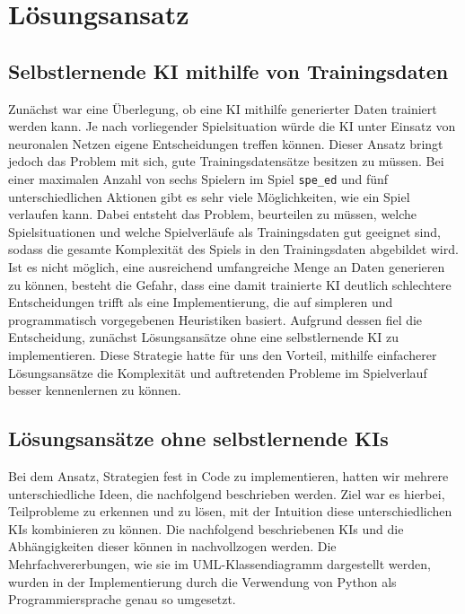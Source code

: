 \chapter{Lösungsansatz}
\label{ch:loesungsansatz}

\section{Selbstlernende KI mithilfe von Trainingsdaten}
\label{sec:selbstlernende-ki-trainingsdaten}

Zunächst war eine Überlegung, ob eine \ac{KI} mithilfe generierter Daten trainiert werden kann.
Je nach vorliegender Spielsituation würde die \ac{KI} \bspw unter Einsatz von neuronalen Netzen eigene Entscheidungen treffen können.
Dieser Ansatz bringt jedoch das Problem mit sich, gute Trainingsdatensätze besitzen zu müssen.
Bei einer maximalen Anzahl von sechs Spielern im Spiel \texttt{spe\_ed} und fünf unterschiedlichen Aktionen gibt
es sehr viele Möglichkeiten, wie ein Spiel verlaufen kann.
Dabei entsteht das Problem, beurteilen zu müssen, welche Spielsituationen und welche Spielverläufe als Trainingsdaten
gut geeignet sind, sodass die gesamte Komplexität des Spiels in den Trainingsdaten abgebildet wird.
Ist es nicht möglich, eine ausreichend umfangreiche Menge an Daten generieren zu können, besteht die Gefahr, dass eine
damit trainierte \ac{KI} deutlich schlechtere Entscheidungen trifft als eine Implementierung, die auf simpleren und
programmatisch vorgegebenen Heuristiken basiert.
Aufgrund dessen fiel die Entscheidung, zunächst Lösungsansätze ohne eine selbstlernende \ac{KI} zu implementieren.
Diese Strategie hatte für uns den Vorteil, mithilfe einfacherer Lösungsansätze die Komplexität und auftretenden Probleme
im Spielverlauf besser kennenlernen zu können.

\section{Lösungsansätze ohne selbstlernende KIs}
\label{sec:loesungsansatz-ohne-selbstlernende-kis}

Bei dem Ansatz, Strategien fest in Code zu implementieren, hatten wir mehrere unterschiedliche Ideen,
die nachfolgend beschrieben werden.
Ziel war es hierbei, Teilprobleme zu erkennen und zu lösen, mit der Intuition diese unterschiedlichen \ac{KI}s
kombinieren zu können.
Die nachfolgend beschriebenen \ac{KI}s und die Abhängigkeiten dieser können in 
nachvollzogen werden.
Die Mehrfachvererbungen, wie sie im UML-Klassendiagramm dargestellt werden, wurden in der Implementierung durch die
Verwendung von Python als Programmiersprache genau so umgesetzt.

